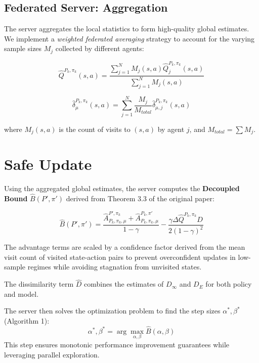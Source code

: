 \documentclass{article}
\begin{document}
\subsection{Federated Server: Aggregation}
The server aggregates the local statistics to form high-quality global estimates. We implement a \textit{weighted federated averaging} strategy to account for the varying sample sizes $M_j$ collected by different agents:

\begin{equation}
    \hat{Q}^{P_k, \pi_k}(s,a) = \frac{\sum_{j=1}^N M_j(s,a) \hat{Q}_j^{P_k, \pi_k}(s,a)}{\sum_{j=1}^N M_j(s,a)}
\end{equation}

\begin{equation}
    \hat{\delta}_{\mu}^{P_k, \pi_k}(s,a) = \sum_{j=1}^N \frac{M_j}{M_{total}} \hat{\delta}_{\mu,j}^{P_k, \pi_k}(s,a)
\end{equation}

where $M_j(s,a)$ is the count of visits to $(s,a)$ by agent $j$, and $M_{total} = \sum M_j$.

\section{Safe Update}
Using the aggregated global estimates, the server computes the \textbf{Decoupled Bound} $\hat{B}(P', \pi')$ derived from Theorem 3.3 of the original paper:

\begin{equation}
    \hat{B}(P', \pi') = \frac{\hat{A}_{P_k,\pi_k,\mu}^{P',\pi_k} + \hat{A}_{P_k,\pi_k,\mu}^{P_k,\pi'}}{1-\gamma} - \frac{\gamma \Delta \hat{Q}^{P_k,\pi_k} \hat{D}}{2(1-\gamma)^2}
\end{equation}

The advantage terms are scaled by a confidence factor derived from the mean visit count of visited state-action pairs to prevent overconfident updates in low-sample regimes while avoiding stagnation from unvisited states.

The dissimilarity term $\hat{D}$ combines the estimates of $D_\infty$ and $D_E$ for both policy and model.

The server then solves the optimization problem to find the step sizes $\alpha^*, \beta^*$ (Algorithm 1):
\begin{equation}
    \alpha^*, \beta^* = \arg \max_{\alpha, \beta} \hat{B}(\alpha, \beta)
\end{equation}
This step ensures monotonic performance improvement guarantees while leveraging parallel exploration.
\end{document}
